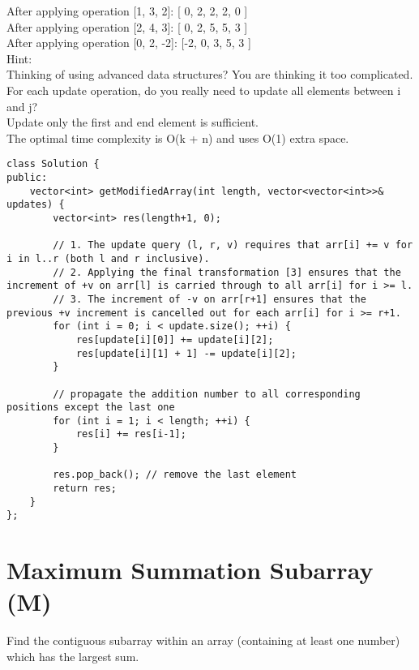 After applying operation [1, 3, 2]:
[ 0, 2, 2, 2, 0 ]\\

After applying operation [2, 4, 3]:
[ 0, 2, 5, 5, 3 ]\\

After applying operation [0, 2, -2]:
[-2, 0, 3, 5, 3 ]\\

Hint:\\
    Thinking of using advanced data structures? You are thinking it too complicated.\\
    For each update operation, do you really need to update all elements between i and j?\\
    Update only the first and end element is sufficient.\\
    The optimal time complexity is O(k + n) and uses O(1) extra space.\\

\begin{lstlisting}
class Solution {
public:
    vector<int> getModifiedArray(int length, vector<vector<int>>& updates) {
        vector<int> res(length+1, 0);
        
        // 1. The update query (l, r, v) requires that arr[i] += v for i in l..r (both l and r inclusive). 
        // 2. Applying the final transformation [3] ensures that the increment of +v on arr[l] is carried through to all arr[i] for i >= l. 
        // 3. The increment of -v on arr[r+1] ensures that the previous +v increment is cancelled out for each arr[i] for i >= r+1. 
        for (int i = 0; i < update.size(); ++i) {
            res[update[i][0]] += update[i][2];      
            res[update[i][1] + 1] -= update[i][2]; 
        }
        
        // propagate the addition number to all corresponding positions except the last one
        for (int i = 1; i < length; ++i) {
            res[i] += res[i-1];                 
        }
        
        res.pop_back(); // remove the last element
        return res;
    }
};
\end{lstlisting}


\section{Maximum Summation Subarray (M)}
Find the contiguous subarray within an array (containing at least one number) which has the largest sum.\\

